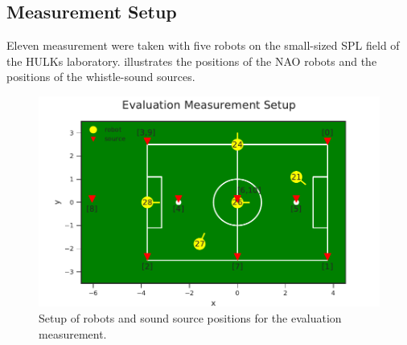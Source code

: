 \subsection{Measurement Setup}
\label{subsec:04_labMeasurements}

Eleven measurement were taken with five robots on the small-sized \ac{SPL} field
of the HULKs laboratory.
 illustrates the positions of the NAO robots
and the positions of the whistle-sound sources.
\begin{figure}[ht]
	\centering
		\includegraphics[]{figures/evaluation/setup}
	\caption{Setup of robots and sound source positions for the evaluation measurement.}
    \label{fig:04_setup}
\end{figure}

